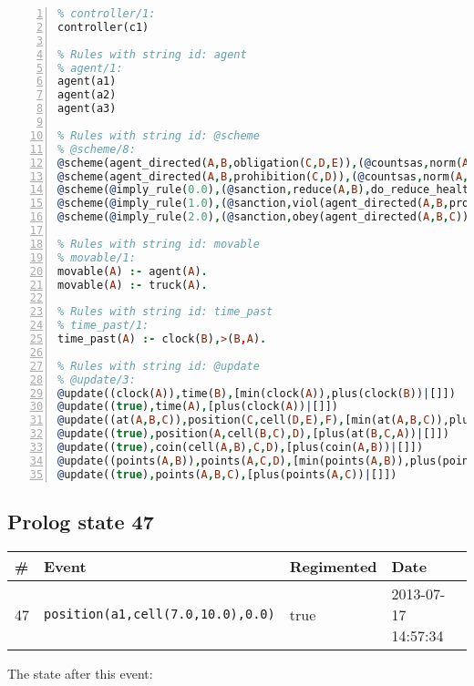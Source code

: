 \documentclass[11pt]{article}\usepackage[utf8]{inputenc}\usepackage{geometry}
\begin{document}
\begin{lstlisting}[language=Prolog, numbers=left]
% Rules with string id: controller
% controller/1:
controller(c1)

% Rules with string id: agent
% agent/1:
agent(a1)
agent(a2)
agent(a3)

% Rules with string id: @scheme
% @scheme/8:
@scheme(agent_directed(A,B,obligation(C,D,E)),(@countsas,norm(A,B,F,obligation(C,D,E)),F),false,(listTrue(C)),(time_past(D)),false,[plus(viol(agent_directed(A,B,obligation(C,D,E))))|[]],[plus(obey(agent_directed(A,B,obligation(C,D,E))))|[]])
@scheme(agent_directed(A,B,prohibition(C,D)),(@countsas,norm(A,B,E,prohibition(C,D)),E),(listTrue(C)),false,(false),false,[plus(viol(agent_directed(A,B,prohibition(C,D))))|[]],[plus(obey(agent_directed(A,B,prohibition(C,D))))|[]])
@scheme(@imply_rule(0.0),(@sanction,reduce(A,B),do_reduce_health(A,B),notifyAgent(A,changed(status))),true,false,false,false,[min(reduce(A,B))|[]],[])
@scheme(@imply_rule(1.0),(@sanction,viol(agent_directed(A,B,prohibition(C,D))),do_sanction(D)),true,false,false,false,[min(viol(agent_directed(A,B,prohibition(C,D))))|[]],[])
@scheme(@imply_rule(2.0),(@sanction,obey(agent_directed(A,B,C))),true,false,false,false,[min(obey(agent_directed(A,B,C)))|[]],[])

% Rules with string id: movable
% movable/1:
movable(A) :- agent(A).
movable(A) :- truck(A).

% Rules with string id: time_past
% time_past/1:
time_past(A) :- clock(B),>(B,A).

% Rules with string id: @update
% @update/3:
@update((clock(A)),time(B),[min(clock(A)),plus(clock(B))|[]])
@update((true),time(A),[plus(clock(A))|[]])
@update((at(A,B,C)),position(C,cell(D,E),F),[min(at(A,B,C)),plus(at(D,E,C))|[]])
@update((true),position(A,cell(B,C),D),[plus(at(B,C,A))|[]])
@update((true),coin(cell(A,B),C,D),[plus(coin(A,B))|[]])
@update((points(A,B)),points(A,C,D),[min(points(A,B)),plus(points(A,D))|[]])
@update((true),points(A,B,C),[plus(points(A,C))|[]])

\end{lstlisting}
\clearpage 
\subsection{Prolog state 47}
\begin{table}[ht]
\centering 
\begin{tabular}{l l l l} 
\textbf{\#} & \textbf{Event} & \textbf{Regimented} & \textbf{Date} \\ [0.5ex] 
\hline
47&\texttt{position(a1,cell(7.0,10.0),0.0)}&true&2013-07-17 14:57:34\\ [1ex] \hline\end{tabular}
\end{table}
The state after this event:
\end{document}
